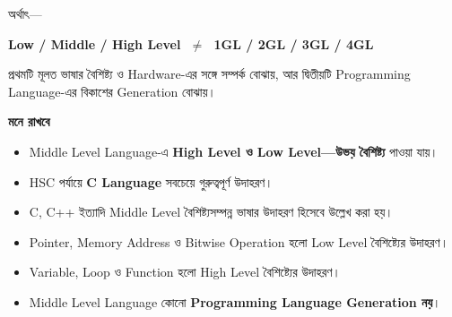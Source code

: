 অর্থাৎ—

\begin{center}

\textbf{
Low / Middle / High Level
\(\;\neq\;\)
1GL / 2GL / 3GL / 4GL
}

\end{center}

প্রথমটি মূলত ভাষার বৈশিষ্ট্য ও Hardware-এর সঙ্গে সম্পর্ক বোঝায়,
আর দ্বিতীয়টি Programming Language-এর বিকাশের Generation বোঝায়।

\begin{rememberbox}

\textbf{\color{deepOrange}মনে রাখবে}

\begin{itemize}

\item Middle Level Language-এ
\textbf{High Level ও Low Level—উভয় বৈশিষ্ট্য} পাওয়া যায়।

\item HSC পর্যায়ে \textbf{C Language} সবচেয়ে গুরুত্বপূর্ণ উদাহরণ।

\item C, C++ ইত্যাদি Middle Level বৈশিষ্ট্যসম্পন্ন ভাষার
উদাহরণ হিসেবে উল্লেখ করা হয়।

\item Pointer, Memory Address ও Bitwise Operation হলো
Low Level বৈশিষ্ট্যের উদাহরণ।

\item Variable, Loop ও Function হলো High Level বৈশিষ্ট্যের উদাহরণ।

\item Middle Level Language কোনো
\textbf{Programming Language Generation নয়}।

\end{itemize}

\end{rememberbox}

\small

